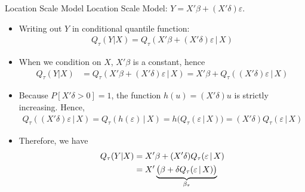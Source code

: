 \documentclass[handout]{beamer}
\begin{document}
\begin{frame}[shrink]{Location Scale Model}
Location Scale Model:
$Y = X'\beta + (X'\delta)\varepsilon$.
\begin{itemize}
  \item
    Writing out $Y$ in conditional quantile function:
    \begin{align*}
      Q_\tau(Y|X)
      =
      Q_\tau(X'\beta + (X'\delta)\varepsilon\,|\,X)
    \end{align*}

  \item
    When we condition on $X$, $X'\beta$ is a constant, hence
    \begin{align*}
      Q_\tau(Y|X)
      &=
      Q_\tau(X'\beta + (X'\delta)\varepsilon\,|\,X)
      =
      X'\beta + Q_\tau((X'\delta)\varepsilon\,|\,X)
    \end{align*}

  \item
    Because $P[X'\delta > 0]=1$, the function $h(u)=(X'\delta)u$ is
    strictly increasing.
    Hence,
    \begin{align*}
      Q_\tau( (X'\delta)\varepsilon\,|\,X)
      =
      Q_\tau(h(\varepsilon)\,|\,X)
      =
      h\big(
      Q_\tau(\varepsilon\,|\,X)
      \big)
      =
      (X'\delta)
      Q_\tau(\varepsilon\,|\,X)
    \end{align*}
  \item
    Therefore, we have
    \begin{align*}
      Q_\tau(Y|X)
      &=
      X'\beta
      +
      (X'\delta)
      Q_\tau(\varepsilon\,|\,X)
      \\
      &=
      X'
      \underbrace{%
        \big(
        \beta
        +
        \delta
        Q_\tau(\varepsilon\,|\,X)
        \big)
      }_{\beta_\tau}
    \end{align*}
\end{itemize}
\end{frame}
\end{document}
